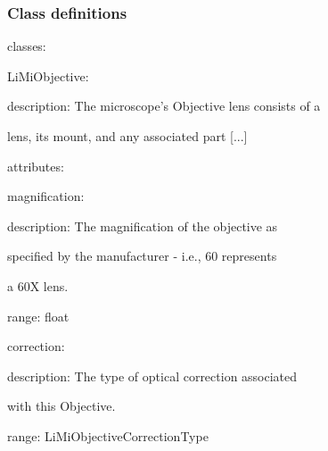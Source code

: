 \begin{frame}
  \frametitle{Class definitions}

\begin{semiverbatim}
classes:

\hspace{1em}LiMiObjective:

\hspace{2em}description: The microscope's Objective lens consists of a

\hspace{3em}lens, its mount, and any associated part [...]

\hspace{2em}attributes:

\hspace{3em}magnification:

\hspace{4em}description: The magnification of the objective as

\hspace{5em}specified by the manufacturer - i.e., 60 represents

\hspace{5em}a 60X lens.

\hspace{4em}range: float

\hspace{3em}correction:

\hspace{4em}description: The type of optical correction associated

\hspace{5em}with this Objective.

\hspace{4em}range: LiMiObjectiveCorrectionType
\end{semiverbatim}
\end{frame}

